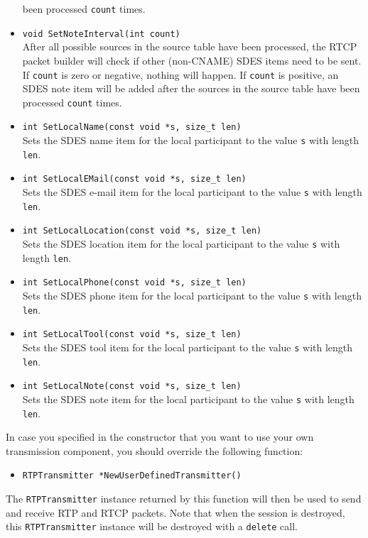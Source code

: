 \documentclass[12pt,a4paper]{article}
\begin{document}
\begin{itemize}
						been processed {\tt count} times.
					\item {\tt void SetNoteInterval(int count)}\\
						After all possible sources in the source table have been
						processed, the RTCP packet builder will check if other (non-CNAME) SDES 
						items need to be sent. If {\tt count} is zero or negative, nothing
						will happen. If {\tt count} is positive, an SDES note
						item will be added after the sources in the source table have
						been processed {\tt count} times.
					\item {\tt int SetLocalName(const void *s, size\_t len)}\\
						Sets the SDES name item for the local participant to the value {\tt s}
						with length {\tt len}.
					\item {\tt int SetLocalEMail(const void *s, size\_t len)}\\
						Sets the SDES e-mail item for the local participant to the value {\tt s}
						with length {\tt len}.
					\item {\tt int SetLocalLocation(const void *s, size\_t len)}\\
						Sets the SDES location item for the local participant to the value {\tt s}
						with length {\tt len}.
					\item {\tt int SetLocalPhone(const void *s, size\_t len)}\\
						Sets the SDES phone item for the local participant to the value {\tt s}
						with length {\tt len}.
					\item {\tt int SetLocalTool(const void *s, size\_t len)}\\
						Sets the SDES tool item for the local participant to the value {\tt s}
						with length {\tt len}.
					\item {\tt int SetLocalNote(const void *s, size\_t len)}\\
						Sets the SDES note item for the local participant to the value {\tt s}
						with length {\tt len}.
				\end{itemize}

				In case you specified in the constructor that you want to use your own
				transmission component, you should override the following function:
				\begin{itemize}
					\item {\tt RTPTransmitter *NewUserDefinedTransmitter()}
				\end{itemize}
				The {\tt RTPTransmitter} instance returned by this function will then
				be used to send and receive RTP and RTCP packets. Note that when the
				session is destroyed, this {\tt RTPTransmitter} instance will be destroyed
				with a {\tt delete} call.
\end{document}
